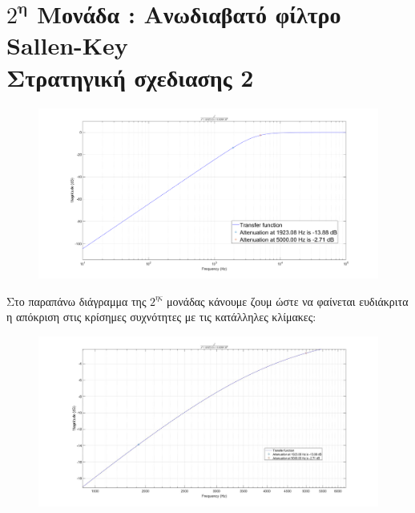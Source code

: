 \documentclass{article}
\begin{document}
{{{\section*{$2^\textbf{η}$ Μονάδα : Ανωδιαβατό φίλτρο Sallen-Key \\ Στρατηγική σχεδιασης 2} 
  \begin{figure}[h!]
\centering
 		\advance\leftskip-4cm
  \includegraphics[width=190mm,scale=2]{thema4/t2.png}
\end{figure} 
\normalsize{}
Στο παραπάνω διάγραμμα της $2^{ης}$ μονάδας κάνουμε ζουμ ώστε να φαίνεται ευδιάκριτα η απόκριση στις κρίσημες συχνότητες με τις κατάλληλες κλίμακες:
\large{}
  \begin{figure}[h!]
\centering
 	\advance\leftskip-1cm
  \includegraphics[width=120mm,scale=2]{thema4/z2.jpg}
\end{figure} 
\newpage
}}}
\end{document}
